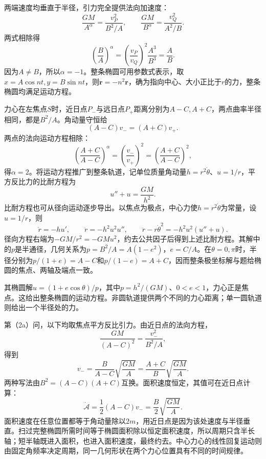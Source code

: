 \documentclass[UTF8,fontset=fandol,a4paper,11pt]{ctexart}
\begin{document}
两端速度均垂直于半径，引力完全提供法向加速度：
\[
\frac{GM}{A^\alpha}=\frac{v_P^2}{B^2/A},\qquad
\frac{GM}{B^\alpha}=\frac{v_Q^2}{A^2/B}.
\]
两式相除得
\[
\left(\frac BA\right)^\alpha
=\left(\frac{v_P}{v_Q}\right)^2\frac{A^3}{B^3}
=\frac AB.
\]
因为$A\ne B$，所以$\boxed{\alpha=-1}$。整条椭圆可用参数式表示，取
$x=A\cos nt,y=B\sin nt$，则$\ddot{\boldsymbol r}=-n^2\boldsymbol r$，确为指向中心、大小正比于$r$的力，整条椭圆均满足运动方程。

力心在左焦点$S$时，近日点$P_-$与远日点$P_+$距离分别为$A-C,A+C$，两点曲率半径相同，都是$B^2/A$。角动量守恒给
\[
(A-C)v_-=(A+C)v_+.
\]
两点的法向运动方程相除：
\[
\left(\frac{A+C}{A-C}\right)^\alpha
=\left(\frac{v_-}{v_+}\right)^2
=\left(\frac{A+C}{A-C}\right)^2,
\]
得$\boxed{\alpha=2}$。将运动方程推广到整条轨道，记单位质量角动量$h=r^2\dot\theta$、$u=1/r$，平方反比力的比耐方程为
\[
u''+u=\frac{GM}{h^2}.
\]
比耐方程也可从径向运动逐步导出。以焦点为极点，中心力使$h=r^2\dot\theta$为常量，设$u=1/r$，则
\[
\dot r=-h u',\qquad \ddot r=-h^2u^2u'',\qquad
\ddot r-r\dot\theta^2=-h^2u^2(u''+u).
\]
径向方程右端为$-GM/r^2=-GMu^2$，约去公共因子后得到上述比耐方程。其解中的$p$是半通径，几何关系为$p=B^2/A=A(1-e^2)$，$e=C/A$。在$\theta=0,\pi$时，半径分别为$p/(1+e)=A-C$和$p/(1-e)=A+C$，因而整条极坐标解与题给椭圆的焦点、两轴及端点一致。

其椭圆解$u=(1+e\cos\theta)/p$，其中$p=h^2/(GM)$、$0<e<1$，力心正是焦点。这给出整条椭圆的运动方程。非圆轨道提供两个不同的力心距离；单一圆轨道则给出一个半径处的力。

第（2a）问，以下均取焦点平方反比引力。由近日点的法向方程，
\[
\frac{GM}{(A-C)^2}=\frac{v_-^2}{B^2/A},
\]
得到
\[
\boxed{v_-=\frac B{A-C}\sqrt{\frac{GM}{A}}
=\frac{A+C}{B}\sqrt{\frac{GM}{A}}}.
\]
两种写法由$B^2=(A-C)(A+C)$互换。面积速度恒定，其值可在近日点计算：
\[
\dot{\mathcal A}=\frac12(A-C)v_-=\frac B2\sqrt{\frac{GM}{A}}.
\]
面积速度在任意位置都等于角动量除以$2m$，用近日点是因为该处速度与半径垂直。扫过完整椭圆所需时间等于椭圆面积除以恒定面积速度，所以周期只含半长轴；短半轴既进入面积，也进入面积速度，最终约去。中心力心的线性回复运动则由固定角频率决定周期，同一几何形状在两个力心位置具有不同的时间规律。
\end{document}
